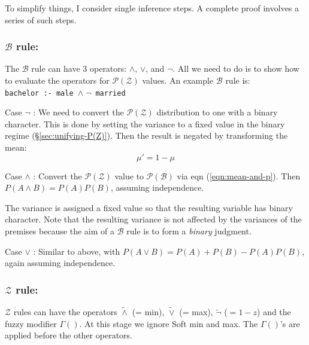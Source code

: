 \documentclass[a4paper]{report}
\begin{document}
To simplify things, I consider single inference steps.  A complete proof involves a series of such steps.

\subsubsection{$\mathcal{B}$ rule:}

The $\mathcal{B}$ rule can have 3 operators: $\wedge$, $\vee$, and $\neg$.  All we need to do is to show how to evaluate the operators for $\mathcal{P(Z)}$ values.  An example $\mathcal{B}$ rule is:\\
\hspace*{1cm} \texttt{bachelor :- male $\wedge \; \neg$ married}

Case $\neg$ :  We need to convert the $\mathcal{P(Z)}$ distribution to one with a binary character.  This is done by setting the variance to a fixed value in the binary regime (\S\ref{sec:unifying-P(Z)}).  Then the result is negated by transforming the mean:
\begin{equation}
\mu ' = 1 - \mu
\label{eqn:1-minus-z-transform}
\end{equation}

Case $\wedge$ : Convert the $\mathcal{P(Z)}$ value to $\mathcal{P(B)}$ via eqn (\ref{eqn:mean-and-p}).  Then $P(A \wedge B) = P(A) P(B)$, assuming independence.

The variance is assigned a fixed value so that the resulting variable has binary character.  Note that the resulting variance is not affected by the variances of the premises because the aim of a $\mathcal{B}$ rule is to form a \textit{binary} judgment.

Case $\vee$ : Similar to above, with $P(A \vee B) = P(A) + P(B) - P(A)P(B)$, again assuming independence.

\subsubsection{$\mathcal{Z}$ rule:}

$\mathcal{Z}$ rules can have the operators $\widetilde{\wedge}$ (= min), $\widetilde{\vee}$ (= max), $\widetilde{\neg}$ ($= 1-z$) and the fuzzy modifier $\Gamma()$.  At this stage we ignore Soft min and max.  The $\Gamma()$'s are applied before the other operators.
\end{document}
